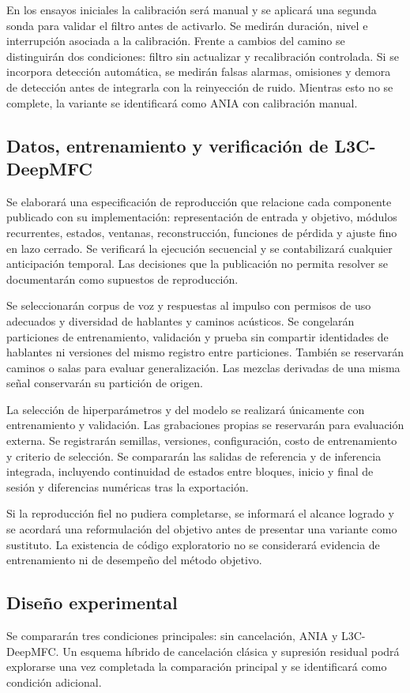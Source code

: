En los ensayos iniciales la calibración será manual y se aplicará una segunda sonda para validar el filtro antes de activarlo. Se medirán duración, nivel e interrupción asociada a la calibración. Frente a cambios del camino se distinguirán dos condiciones: filtro sin actualizar y recalibración controlada. Si se incorpora detección automática, se medirán falsas alarmas, omisiones y demora de detección antes de integrarla con la reinyección de ruido. Mientras esto no se complete, la variante se identificará como ANIA con calibración manual.

\subsection{Datos, entrenamiento y verificación de L3C-DeepMFC}
Se elaborará una especificación de reproducción que relacione cada componente publicado con su implementación: representación de entrada y objetivo, módulos recurrentes, estados, ventanas, reconstrucción, funciones de pérdida y ajuste fino en lazo cerrado. Se verificará la ejecución secuencial y se contabilizará cualquier anticipación temporal. Las decisiones que la publicación no permita resolver se documentarán como supuestos de reproducción.

Se seleccionarán corpus de voz y respuestas al impulso con permisos de uso adecuados y diversidad de hablantes y caminos acústicos. Se congelarán particiones de entrenamiento, validación y prueba sin compartir identidades de hablantes ni versiones del mismo registro entre particiones. También se reservarán caminos o salas para evaluar generalización. Las mezclas derivadas de una misma señal conservarán su partición de origen.

La selección de hiperparámetros y del modelo se realizará únicamente con entrenamiento y validación. Las grabaciones propias se reservarán para evaluación externa. Se registrarán semillas, versiones, configuración, costo de entrenamiento y criterio de selección. Se compararán las salidas de referencia y de inferencia integrada, incluyendo continuidad de estados entre bloques, inicio y final de sesión y diferencias numéricas tras la exportación.

Si la reproducción fiel no pudiera completarse, se informará el alcance logrado y se acordará una reformulación del objetivo antes de presentar una variante como sustituto. La existencia de código exploratorio no se considerará evidencia de entrenamiento ni de desempeño del método objetivo.

\subsection{Diseño experimental}
Se compararán tres condiciones principales: sin cancelación, ANIA y L3C-DeepMFC. Un esquema híbrido de cancelación clásica y supresión residual podrá explorarse una vez completada la comparación principal y se identificará como condición adicional.

